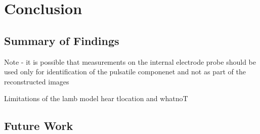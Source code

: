 \chapter{Conclusion}

\section{Summary of Findings}

Note - it is possible that measurements on the internal electrode probe 
should be used only for identification of the pulsatile componenet and not
as part of the reconstructed images

Limitations of the lamb model
hear tlocation and whatnoT

\section{Future Work}